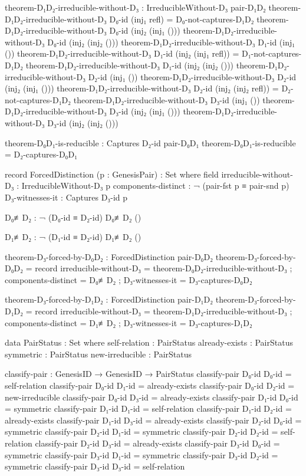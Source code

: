 \documentclass[11pt,a4paper]{book}
\begin{document}
\begin{code}
theorem-D₁D₂-irreducible-without-D₃ : IrreducibleWithout-D₃ pair-D₁D₂
theorem-D₁D₂-irreducible-without-D₃ D₀-id (inj₁ refl) = D₀-not-captures-D₁D₂
theorem-D₁D₂-irreducible-without-D₃ D₀-id (inj₂ (inj₁ ()))
theorem-D₁D₂-irreducible-without-D₃ D₀-id (inj₂ (inj₂ ()))
theorem-D₁D₂-irreducible-without-D₃ D₁-id (inj₁ ())
theorem-D₁D₂-irreducible-without-D₃ D₁-id (inj₂ (inj₁ refl)) = D₁-not-captures-D₁D₂
theorem-D₁D₂-irreducible-without-D₃ D₁-id (inj₂ (inj₂ ()))
theorem-D₁D₂-irreducible-without-D₃ D₂-id (inj₁ ())
theorem-D₁D₂-irreducible-without-D₃ D₂-id (inj₂ (inj₁ ()))
theorem-D₁D₂-irreducible-without-D₃ D₂-id (inj₂ (inj₂ refl)) = D₂-not-captures-D₁D₂
theorem-D₁D₂-irreducible-without-D₃ D₃-id (inj₁ ())
theorem-D₁D₂-irreducible-without-D₃ D₃-id (inj₂ (inj₁ ()))
theorem-D₁D₂-irreducible-without-D₃ D₃-id (inj₂ (inj₂ ()))

theorem-D₀D₁-is-reducible : Captures D₂-id pair-D₀D₁
theorem-D₀D₁-is-reducible = D₂-captures-D₀D₁

record ForcedDistinction (p : GenesisPair) : Set where
  field
    irreducible-without-D₃ : IrreducibleWithout-D₃ p
    components-distinct : ¬ (pair-fst p ≡ pair-snd p)
    D₃-witnesses-it : Captures D₃-id p

D₀≢D₂ : ¬ (D₀-id ≡ D₂-id)
D₀≢D₂ ()

D₁≢D₂ : ¬ (D₁-id ≡ D₂-id)
D₁≢D₂ ()

theorem-D₃-forced-by-D₀D₂ : ForcedDistinction pair-D₀D₂
theorem-D₃-forced-by-D₀D₂ = record
  { irreducible-without-D₃ = theorem-D₀D₂-irreducible-without-D₃
  ; components-distinct = D₀≢D₂
  ; D₃-witnesses-it = D₃-captures-D₀D₂
  }

theorem-D₃-forced-by-D₁D₂ : ForcedDistinction pair-D₁D₂
theorem-D₃-forced-by-D₁D₂ = record
  { irreducible-without-D₃ = theorem-D₁D₂-irreducible-without-D₃
  ; components-distinct = D₁≢D₂
  ; D₃-witnesses-it = D₃-captures-D₁D₂
  }

data PairStatus : Set where
  self-relation   : PairStatus
  already-exists  : PairStatus
  symmetric       : PairStatus
  new-irreducible : PairStatus

classify-pair : GenesisID → GenesisID → PairStatus
classify-pair D₀-id D₀-id = self-relation
classify-pair D₀-id D₁-id = already-exists
classify-pair D₀-id D₂-id = new-irreducible
classify-pair D₀-id D₃-id = already-exists
classify-pair D₁-id D₀-id = symmetric
classify-pair D₁-id D₁-id = self-relation
classify-pair D₁-id D₂-id = already-exists
classify-pair D₁-id D₃-id = already-exists
classify-pair D₂-id D₀-id = symmetric
classify-pair D₂-id D₁-id = symmetric
classify-pair D₂-id D₂-id = self-relation
classify-pair D₂-id D₃-id = already-exists
classify-pair D₃-id D₀-id = symmetric
classify-pair D₃-id D₁-id = symmetric
classify-pair D₃-id D₂-id = symmetric
classify-pair D₃-id D₃-id = self-relation


\end{code}
\end{document}
